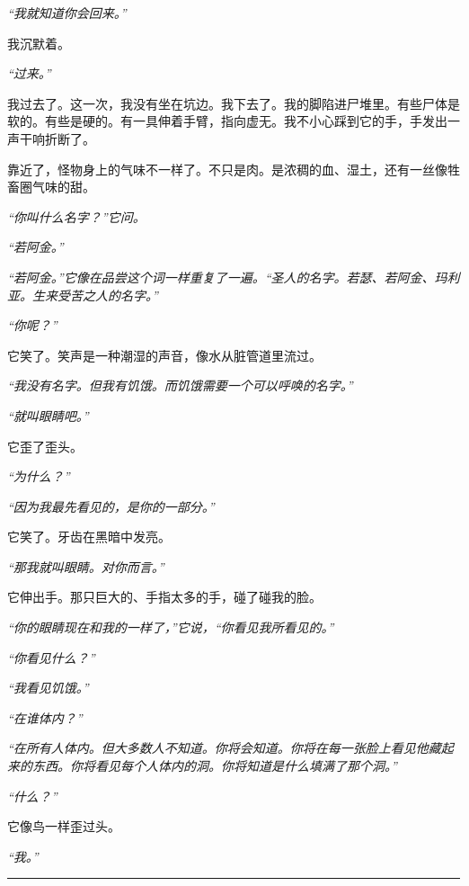 \noindent \textit{“我就知道你会回来。”}

\noindent 我沉默着。

\noindent \textit{“过来。”}

\noindent 我过去了。这一次，我没有坐在坑边。我下去了。我的脚陷进尸堆里。有些尸体是软的。有些是硬的。有一具伸着手臂，指向虚无。我不小心踩到它的手，手发出一声干响折断了。

\noindent 靠近了，怪物身上的气味不一样了。不只是肉。是浓稠的血、湿土，还有一丝像牲畜圈气味的甜。

\noindent \textit{“你叫什么名字？”它问。}

\noindent \textit{“若阿金。”}

\noindent \textit{“若阿金。”它像在品尝这个词一样重复了一遍。“圣人的名字。若瑟、若阿金、玛利亚。生来受苦之人的名字。”}

\noindent \textit{“你呢？”}

\noindent 它笑了。笑声是一种潮湿的声音，像水从脏管道里流过。

\noindent \textit{“我没有名字。但我有饥饿。而饥饿需要一个可以呼唤的名字。”}

\noindent \textit{“就叫眼睛吧。”}

\noindent 它歪了歪头。

\noindent \textit{“为什么？”}

\noindent \textit{“因为我最先看见的，是你的一部分。”}

\noindent 它笑了。牙齿在黑暗中发亮。

\noindent \textit{“那我就叫眼睛。对你而言。”}

\noindent 它伸出手。那只巨大的、手指太多的手，碰了碰我的脸。

\noindent \textit{“你的眼睛现在和我的一样了，”它说，“你看见我所看见的。”}

\noindent \textit{“你看见什么？”}

\noindent \textit{“我看见饥饿。”}

\noindent \textit{“在谁体内？”}

\noindent \textit{“在所有人体内。但大多数人不知道。你将会知道。你将在每一张脸上看见他藏起来的东西。你将看见每个人体内的洞。你将知道是什么填满了那个洞。”}

\noindent \textit{“什么？”}

\noindent 它像鸟一样歪过头。

\noindent \textit{“我。”}

\vspace{0.5em}\noindent\rule{\textwidth}{0.5pt}\vspace{0.5em}


